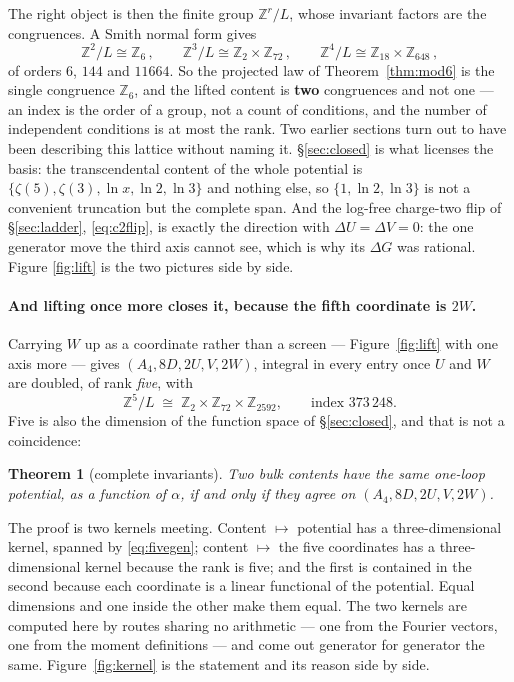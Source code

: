 \documentclass[11pt,a4paper]{article}
\newtheorem{theorem}{Theorem}
\newcommand{\ZZ}{\mathbb{Z}}
\begin{document}
The right object is then the finite group $\ZZ^r/L$, whose invariant factors are the congruences.
A Smith normal form gives
\begin{equation}\label{eq:snf}
  \ZZ^2/L\cong\ZZ_6\,,\qquad
  \ZZ^3/L\cong\ZZ_2\times\ZZ_{72}\,,\qquad
  \ZZ^4/L\cong\ZZ_{18}\times\ZZ_{648}\,,
\end{equation}
of orders $6$, $144$ and $11664$. So the projected law of Theorem~\ref{thm:mod6} is the single
congruence $\ZZ_6$, and the lifted content is \textbf{two} congruences and not one --- an index is
the order of a group, not a count of conditions, and the number of independent conditions is at most
the rank. Two earlier sections turn out to have been describing this lattice without naming it.
\S\ref{sec:closed} is what licenses the basis: the transcendental content of the whole potential is
$\{\zeta(5),\zeta(3),\ln x,\ln 2,\ln 3\}$ and nothing else, so $\{1,\ln2,\ln3\}$ is not a
convenient truncation but the complete span. And the log-free charge-two flip of
\S\ref{sec:ladder}, \eqref{eq:c2flip}, is exactly the direction with $\Delta U=\Delta V=0$: the one
generator move the third axis cannot see, which is why its $\Delta G$ was rational. Figure
\ref{fig:lift} is the two pictures side by side.

\paragraph{And lifting once more closes it, because the fifth coordinate is $2W$.} Carrying $W$ up
as a coordinate rather than a screen --- Figure~\ref{fig:lift} with one axis more --- gives
$(A_4,8D,2U,V,2W)$, integral in every entry once $U$ and
$W$ are doubled, of rank \emph{five}, with
\begin{equation}\label{eq:snf5}
  \ZZ^5/L\;\cong\;\ZZ_2\times\ZZ_{72}\times\ZZ_{2592},\qquad\text{index }373\,248 .
\end{equation}
Five is also the dimension of the function space of \S\ref{sec:closed}, and that is not a
coincidence:
\begin{theorem}[complete invariants]\label{thm:complete}
Two bulk contents have the same one-loop potential, as a function of $\alpha$, if and only if they
agree on $(A_4,8D,2U,V,2W)$.
\end{theorem}
\noindent The proof is two kernels meeting. Content $\mapsto$ potential has a three-dimensional
kernel, spanned by \eqref{eq:fivegen}; content $\mapsto$ the five coordinates has a
three-dimensional kernel because the rank is five; and the first is contained in the second because
each coordinate is a linear functional of the potential. Equal dimensions and one inside the other
make them equal. The two kernels are computed here by routes sharing no arithmetic --- one from the
Fourier vectors, one from the moment definitions --- and come out generator for generator the same.
Figure~\ref{fig:kernel} is the statement and its reason side by side.
\end{document}

